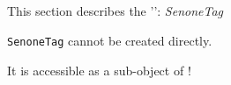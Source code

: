
\subsection{}

This section describes the '': \textsl{SenoneTag}

\begin{description}
\vspace{3mm}  \item[Creation:] \texttt{SenoneTag} cannot be created directly.\

It is accessible as a sub-object of !

\end{description}

